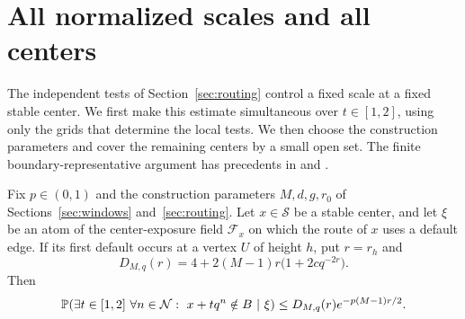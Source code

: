 \section{All normalized scales and all centers}\label{sec:scales}

The independent tests of Section~\ref{sec:routing} control a fixed
scale at a fixed stable center.  We first make this estimate simultaneous
over $t\in[1,2]$, using only the grids that determine the local tests.
We then choose the construction parameters and cover the remaining
centers by a small open set.  The finite boundary-representative argument
has precedents in \cite[proof of Theorem~15]{Chlebik2015} and
\cite[Section~3.1]{KolountzakisPapageorgiou2025}.

\begin{lemma}
\label{lem:conditional-scales}
Fix $p\in(0,1)$ and the construction parameters $M,d,g,r_0$ of
Sections~\ref{sec:windows} and~\ref{sec:routing}.
Let $x\in\mathcal S$ be a stable center, and let $\xi$ be an atom of
the center-exposure field $\mathcal F_x$ on which the route of $x$
uses a default edge.  If its first default occurs at a vertex $U$ of
height $h$, put $r=r_h$ and
\begin{equation}\label{eq:scale-count}
 D_{M,q}(r)=4+2(M-1)r\bigl(1+2c q^{-2r}\bigr).
\end{equation}
Then
\begin{equation}\label{eq:conditional-scales}
 \mathbb P\!\left(
  \exists t\in[1,2]\ \forall n\in\mathcal N:\
  x+tq^n\notin B\ \middle|\ \xi
 \right)
 \le D_{M,q}(r)e^{-p(M-1)r/2}.
\end{equation}
\end{lemma}

